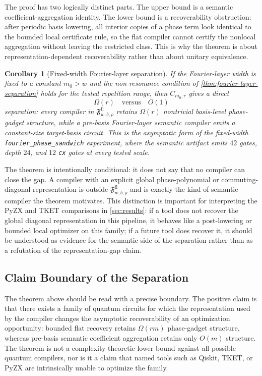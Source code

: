 \documentclass[11pt]{article}
\newtheorem{corollary}{Corollary}
\begin{document}
The proof has two logically distinct parts. The upper bound is a semantic
coefficient-aggregation identity. The lower bound is a recoverability
obstruction: after periodic basis lowering, all interior copies of a phase term
look identical to the bounded local certificate rule, so the flat compiler
cannot certify the nonlocal aggregation without leaving the restricted class.
This is why the theorem is about representation-dependent recoverability rather
than about unitary equivalence.

\begin{corollary}[Fixed-width Fourier-layer separation]
\label{cor:fixed-width-fourier}
If the Fourier-layer width is fixed to a constant $m_0>w$ and the
non-resonance condition of \cref{thm:fourier-layer-separation} holds for the
tested repetition range, then $C_{m_0,r}$ gives a direct
\[
\Omega(r) \quad \text{versus} \quad O(1)
\]
separation: every compiler in
$\mathfrak{F}^{\mathrm{fl}}_{w,b,\rho}$ retains $\Omega(r)$ nontrivial
basis-level phase-gadget structure, while a pre-basis Fourier-layer semantic
compiler emits a constant-size target-basis circuit. This is the asymptotic
form of the fixed-width \texttt{fourier\_phase\_sandwich} experiment, where
the semantic artifact emits $42$ gates, depth $24$, and $12$ \texttt{cx} gates
at every tested scale.
\end{corollary}

The theorem is intentionally conditional: it does not say that no compiler can
close the gap. A compiler with an explicit global phase-polynomial or
commuting-diagonal representation is outside
$\mathfrak{F}^{\mathrm{fl}}_{w,b,\rho}$ and is exactly the kind of semantic
compiler the theorem motivates. This distinction is important for interpreting
the PyZX and TKET comparisons in \cref{sec:results}: if a tool does not recover
the global diagonal representation in this pipeline, it behaves like a
post-lowering or bounded local optimizer on this family; if a future tool does
recover it, it should be understood as evidence for the semantic side of the
separation rather than as a refutation of the representation-gap claim.

\subsection{Claim Boundary of the Separation}

The theorem above should be read with a precise boundary. The positive claim is
that there exists a family of quantum circuits for which the representation
used by the compiler changes the asymptotic recoverability of an optimization
opportunity: bounded flat recovery retains $\Omega(rm)$ phase-gadget structure,
whereas pre-basis semantic coefficient aggregation retains only $O(m)$
structure. The theorem is not a complexity-theoretic lower bound against all
possible quantum compilers, nor is it a claim that named tools such as Qiskit,
TKET, or PyZX are intrinsically unable to optimize the family.
\end{document}

